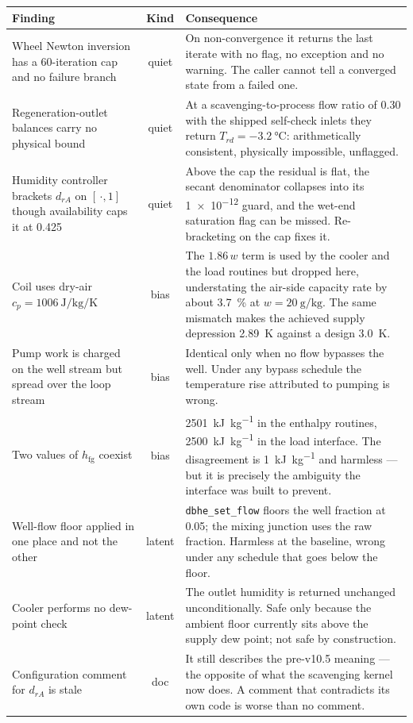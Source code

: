 \documentclass[11pt]{article}
\newcommand{\hfg}{\ensuremath{h_{\mathrm{fg}}}}
\begin{document}
\begin{longtable}{@{}p{}cp{}@{}}
\toprule
\textbf{Finding} & \textbf{Kind} & \textbf{Consequence} \\
\midrule
\endhead
Wheel Newton inversion has a 60-iteration cap and no failure branch &
quiet & On non-convergence it returns the last iterate with no flag, no
exception and no warning. The caller cannot tell a converged state from a
failed one. \\
Regeneration-outlet balances carry no physical bound &
quiet & At a scavenging-to-process flow ratio of \num{0.30} with the shipped
self-check inlets they return $T_{rd} = \SI{-3.2}{\degreeCelsius}$:
arithmetically consistent, physically impossible, unflagged. \\
Humidity controller brackets $d_{rA}$ on $[\,\cdot,1]$ though availability caps
it at \num{0.425} & quiet & Above the cap the residual is flat, the secant
denominator collapses into its \num{1e-12} guard, and the wet-end saturation
flag can be missed. Re-bracketing on the cap fixes it. \\
\midrule
Coil uses dry-air $c_p = \SI{1006}{\joule\per\kilogram\per\kelvin}$ &
bias & The $1.86\,w$ term is used by the cooler and the load routines but
dropped here, understating the air-side capacity rate by about \SI{3.7}{\percent}
at $w = \SI{20}{\gram\per\kilogram}$. The same mismatch makes the achieved
supply depression \SI{2.89}{\kelvin} against a design \SI{3.0}{\kelvin}. \\
Pump work is charged on the well stream but spread over the loop stream &
bias & Identical only when no flow bypasses the well. Under any bypass
schedule the temperature rise attributed to pumping is wrong. \\
Two values of $\hfg$ coexist &
bias & \SI{2501}{\kilo\joule\per\kilogram} in the enthalpy routines,
\SI{2500}{\kilo\joule\per\kilogram} in the load interface. The disagreement is
\SI{1}{\kilo\joule\per\kilogram} and harmless --- but it is precisely the
ambiguity the interface was built to prevent. \\
\midrule
Well-flow floor applied in one place and not the other &
latent & \verb|dbhe_set_flow| floors the well fraction at \num{0.05}; the
mixing junction uses the raw fraction. Harmless at the baseline, wrong under
any schedule that goes below the floor. \\
Cooler performs no dew-point check &
latent & The outlet humidity is returned unchanged unconditionally. Safe only
because the ambient floor currently sits above the supply dew point; not safe
by construction. \\
Configuration comment for $d_{rA}$ is stale &
doc & It still describes the pre-v10.5 meaning --- the opposite of what the
scavenging kernel now does. A comment that contradicts its own code is worse
than no comment. \\
\bottomrule
\end{longtable}
\end{document}
